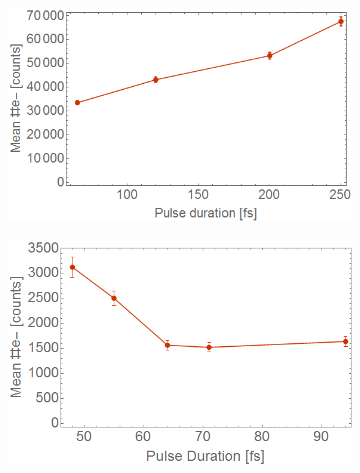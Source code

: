 \begin{figure}[h!]
\begin{subfigure}[l]{0.48\textwidth}
\includegraphics[width=1\textwidth]{../Images/results/MIR_He_pulsescan/raw/meanelect.png} 
\end{subfigure}
\begin{subfigure}[l]{0.48\textwidth}
\includegraphics[width=1\textwidth]{../Images/results/MIR_Ne_pulseduration/MeanElec.png} 
\end{subfigure}


\end{figure}

